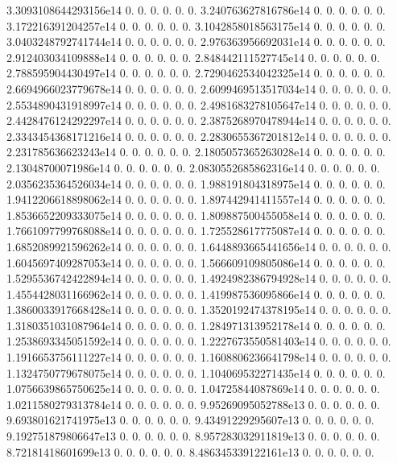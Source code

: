 3.\+3093108644293156e14 0. 0. 0. 0. 0. 0. 3.\+240763627816786e14 0. 0. 0. 0. 0. 0. 3.\+172216391204257e14 0. 0. 0. 0. 0. 0. 3.\+1042858018563175e14 0. 0. 0. 0. 0. 0. 3.\+0403248792741744e14 0. 0. 0. 0. 0. 0. 2.\+976363956692031e14 0. 0. 0. 0. 0. 0. 2.\+912403034109888e14 0. 0. 0. 0. 0. 0. 2.\+848442111527745e14 0. 0. 0. 0. 0. 0. 2.\+788595904430497e14 0. 0. 0. 0. 0. 0. 2.\+7290462534042325e14 0. 0. 0. 0. 0. 0. 2.\+6694966023779678e14 0. 0. 0. 0. 0. 0. 2.\+6099469513517034e14 0. 0. 0. 0. 0. 0. 2.\+5534890431918997e14 0. 0. 0. 0. 0. 0. 2.\+4981683278105647e14 0. 0. 0. 0. 0. 0. 2.\+4428476124292297e14 0. 0. 0. 0. 0. 0. 2.\+3875268970478944e14 0. 0. 0. 0. 0. 0. 2.\+3343454368171216e14 0. 0. 0. 0. 0. 0. 2.\+2830655367201812e14 0. 0. 0. 0. 0. 0. 2.\+231785636623243e14 0. 0. 0. 0. 0. 0. 2.\+1805057365263028e14 0. 0. 0. 0. 0. 0. 2.\+13048700071986e14 0. 0. 0. 0. 0. 0. 2.\+0830552685862316e14 0. 0. 0. 0. 0. 0. 2.\+0356235364526034e14 0. 0. 0. 0. 0. 0. 1.\+988191804318975e14 0. 0. 0. 0. 0. 0. 1.\+9412206618898062e14 0. 0. 0. 0. 0. 0. 1.\+897442941411557e14 0. 0. 0. 0. 0. 0. 1.\+8536652209333075e14 0. 0. 0. 0. 0. 0. 1.\+809887500455058e14 0. 0. 0. 0. 0. 0. 1.\+7661097799768088e14 0. 0. 0. 0. 0. 0. 1.\+725528617775087e14 0. 0. 0. 0. 0. 0. 1.\+6852089921596262e14 0. 0. 0. 0. 0. 0. 1.\+6448893665441656e14 0. 0. 0. 0. 0. 0. 1.\+6045697409287053e14 0. 0. 0. 0. 0. 0. 1.\+566609109805086e14 0. 0. 0. 0. 0. 0. 1.\+5295536742422894e14 0. 0. 0. 0. 0. 0. 1.\+4924982386794928e14 0. 0. 0. 0. 0. 0. 1.\+4554428031166962e14 0. 0. 0. 0. 0. 0. 1.\+419987536095866e14 0. 0. 0. 0. 0. 0. 1.\+3860033917668428e14 0. 0. 0. 0. 0. 0. 1.\+3520192474378195e14 0. 0. 0. 0. 0. 0. 1.\+3180351031087964e14 0. 0. 0. 0. 0. 0. 1.\+284971313952178e14 0. 0. 0. 0. 0. 0. 1.\+2538693345051592e14 0. 0. 0. 0. 0. 0. 1.\+2227673550581403e14 0. 0. 0. 0. 0. 0. 1.\+1916653756111227e14 0. 0. 0. 0. 0. 0. 1.\+1608806236641798e14 0. 0. 0. 0. 0. 0. 1.\+1324750779678075e14 0. 0. 0. 0. 0. 0. 1.\+104069532271435e14 0. 0. 0. 0. 0. 0. 1.\+0756639865750625e14 0. 0. 0. 0. 0. 0. 1.\+04725844087869e14 0. 0. 0. 0. 0. 0. 1.\+0211580279313784e14 0. 0. 0. 0. 0. 0. 9.\+95269095052788e13 0. 0. 0. 0. 0. 0. 9.\+693801621741975e13 0. 0. 0. 0. 0. 0. 9.\+43491229295607e13 0. 0. 0. 0. 0. 0. 9.\+192751879806647e13 0. 0. 0. 0. 0. 0. 8.\+957283032911819e13 0. 0. 0. 0. 0. 0. 8.\+72181418601699e13 0. 0. 0. 0. 0. 0. 8.\+486345339122161e13 0. 0. 0. 0. 0. 0. 
